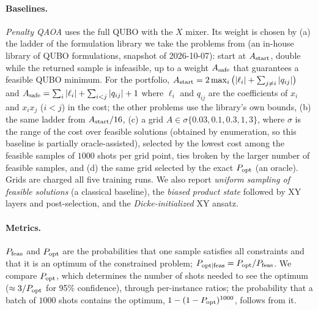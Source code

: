 \paragraph{Baselines.} \emph{Penalty QAOA} uses the full QUBO with the $X$ mixer. Its weight is chosen by
(a) the ladder of the formulation library we take the problems from (an in-house library of QUBO formulations, snapshot of 2026-10-07): start at $A_{\rm start}$, double while the returned sample is infeasible, up to a
weight $A_{\rm safe}$ that guarantees a feasible QUBO minimum. For the portfolio, $A_{\rm start}=2\max_i\big(|\ell_i|+\sum_{j\ne i}|q_{ij}|\big)$ and $A_{\rm safe}=\sum_i|\ell_i|+\sum_{i<j}|q_{ij}|+1$ where $\ell_i$ and $q_{ij}$ are the coefficients of $x_i$ and $x_ix_j$ ($i<j$) in the cost; the other problems use the library's own bounds,
(b) the same ladder from $A_{\rm start}/16$,
(c) a grid $A\in\sigma\{0.03,0.1,0.3,1,3\}$, where $\sigma$ is the range of the cost over feasible solutions (obtained by enumeration, so this baseline is partially oracle-assisted), selected by the lowest cost among the feasible samples of $1000$ shots per grid point, ties broken by the larger number of feasible samples, and
(d) the same grid selected by the exact $P_{\rm opt}$ (an oracle).
Grids are charged all five training runs. We also report \emph{uniform sampling of feasible solutions} (a classical baseline),
the \emph{biased product state} followed by XY layers and post-selection, and the \emph{Dicke-initialized} XY ansatz.

\paragraph{Metrics.} $P_{\rm feas}$ and $P_{\rm opt}$ are the probabilities that one sample satisfies all constraints and that it is an
optimum of the constrained problem; $P_{\rm opt|feas}=P_{\rm opt}/P_{\rm feas}$. We compare $P_{\rm opt}$, which determines the number of shots needed to see the optimum ($\approx 3/P_{\rm opt}$ for 95\% confidence), through per-instance ratios; the probability that a batch of $1000$ shots contains the optimum, $1-(1-P_{\rm opt})^{1000}$, follows from it.

